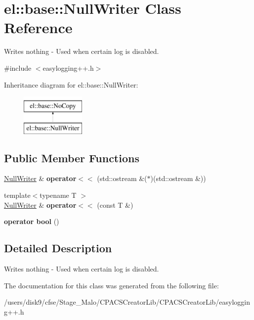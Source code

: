 \hypertarget{classel_1_1base_1_1NullWriter}{\section{el\-:\-:base\-:\-:Null\-Writer Class Reference}
\label{classel_1_1base_1_1NullWriter}
}


Writes nothing -\/ Used when certain log is disabled.  




{\ttfamily \#include $<$easylogging++.\-h$>$}

Inheritance diagram for el\-:\-:base\-:\-:Null\-Writer\-:\begin{figure}[H]
\begin{center}
\leavevmode
\includegraphics[height=2.000000cm]{classel_1_1base_1_1NullWriter}
\end{center}
\end{figure}
\subsection*{Public Member Functions}
\begin{DoxyCompactItemize}
\item 
\hypertarget{classel_1_1base_1_1NullWriter_a39cb7d47986d70c2b4e9d78d1482da7d}{\hyperlink{classel_1_1base_1_1NullWriter}{Null\-Writer} \& {\bfseries operator$<$$<$} (std\-::ostream \&($\ast$)(std\-::ostream \&))}\label{classel_1_1base_1_1NullWriter_a39cb7d47986d70c2b4e9d78d1482da7d}

\item 
\hypertarget{classel_1_1base_1_1NullWriter_a57cb0f5d93ebac076b8ef94d6eff65a2}{{\footnotesize template$<$typename T $>$ }\\\hyperlink{classel_1_1base_1_1NullWriter}{Null\-Writer} \& {\bfseries operator$<$$<$} (const T \&)}\label{classel_1_1base_1_1NullWriter_a57cb0f5d93ebac076b8ef94d6eff65a2}

\item 
\hypertarget{classel_1_1base_1_1NullWriter_a0d1313fd900f548bb67bc1a1785a4048}{{\bfseries operator bool} ()}\label{classel_1_1base_1_1NullWriter_a0d1313fd900f548bb67bc1a1785a4048}

\end{DoxyCompactItemize}


\subsection{Detailed Description}
Writes nothing -\/ Used when certain log is disabled. 

The documentation for this class was generated from the following file\-:\begin{DoxyCompactItemize}
\item 
/users/disk9/cfse/\-Stage\-\_\-\-Malo/\-C\-P\-A\-C\-S\-Creator\-Lib/\-C\-P\-A\-C\-S\-Creator\-Lib/easylogging++.\-h\end{DoxyCompactItemize}
